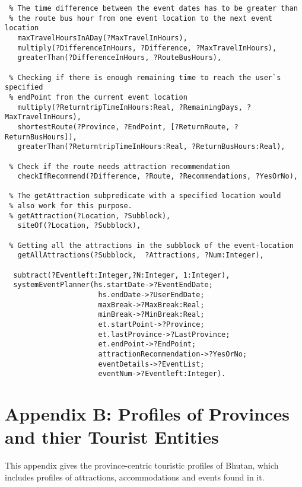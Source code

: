 \begin{verbatim}
 % The time difference between the event dates has to be greater than 
 % the route bus hour from one event location to the next event location
   maxTravelHoursInADay(?MaxTravelInHours),
   multiply(?DifferenceInHours, ?Difference, ?MaxTravelInHours),
   greaterThan(?DifferenceInHours, ?RouteBusHours),
     
 % Checking if there is enough remaining time to reach the user`s specified 
 % endPoint from the current event location
   multiply(?ReturntripTimeInHours:Real, ?RemainingDays, ?MaxTravelInHours),
   shortestRoute(?Province, ?EndPoint, [?ReturnRoute, ?ReturnBusHours]),
   greaterThan(?ReturntripTimeInHours:Real, ?ReturnBusHours:Real),
 
 % Check if the route needs attraction recommendation
   checkIfRecommend(?Difference, ?Route, ?Recommendations, ?YesOrNo),
  
 % The getAttraction subpredicate with a specified location would 
 % also work for this purpose.
 % getAttraction(?Location, ?Subblock),
   siteOf(?Location, ?Subblock),
   
 % Getting all the attractions in the subblock of the event-location
   getAllAttractions(?Subblock,  ?Attractions, ?Num:Integer),
  
  subtract(?Eventleft:Integer,?N:Integer, 1:Integer),
  systemEventPlanner(hs.startDate->?EventEndDate; 
                      hs.endDate->?UserEndDate; 
                      maxBreak->?MaxBreak:Real;
                      minBreak->?MinBreak:Real;
                      et.startPoint->?Province;
                      et.lastProvince->?LastProvince;
                      et.endPoint->?EndPoint;   
                      attractionRecommendation->?YesOrNo;                     
                      eventDetails->?EventList;  
                      eventNum->?Eventleft:Integer).
\end{verbatim}  

\footnotesize
\chapter*{Appendix B: Profiles of Provinces and thier Tourist Entities}

This
appendix gives the province-centric touristic profiles of Bhutan, which includes 
profiles of attractions, accommodations and events found in it.

